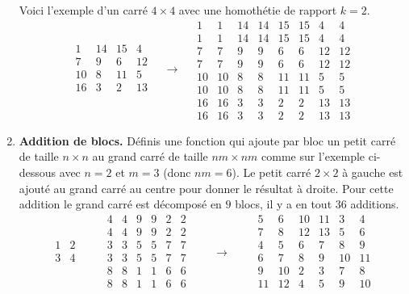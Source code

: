 \documentclass[11pt,class=report,crop=false]{standalone}
\begin{document}
\begin{activite}
\begin{enumerate}
Voici l'exemple d'un carré $4\times 4$ avec une homothétie de rapport $k=2$.
$$  
  \begin{array}{c|c|c|c}  
  1& 14& 15& 4\\\hline
  7& 9& 6& 12\\\hline
  10& 8& 11& 5\\\hline
  16& 3& 2& 13\\    
  \end{array} 
\quad  \longrightarrow \quad 
  \begin{array}{cc|cc|cc|cc}
 1& 1&14&14&15&15& 4& 4\\
  1& 1&14&14&15&15& 4& 4\\\hline
  7& 7& 9& 9& 6& 6&12&12\\
  7& 7& 9& 9& 6& 6&12&12\\\hline
 10&10& 8& 8&11&11& 5& 5\\
 10&10& 8& 8&11&11& 5& 5\\\hline
 16&16& 3& 3& 2& 2&13&13\\
 16&16& 3& 3& 2& 2&13&13
 \end{array}
  $$
  
\item \textbf{Addition de blocs.} Définis une fonction  qui ajoute par bloc un petit carré de taille $n \times n$ au grand carré de taille $nm \times nm$ comme sur l'exemple ci-dessous avec $n=2$ et $m=3$ (donc $nm=6$). Le petit carré $2 \times 2$ à gauche est ajouté au grand carré au centre pour donner le résultat à droite. Pour cette addition le grand carré est décomposé en $9$ blocs, il y a en tout $36$ additions.
$$
  \begin{array}{cc} 
  1& 2  \\
  3& 4  \\
  \end{array}
  \qquad
  \begin{array}{cc|cc|cc}  
  4& 4& 9& 9& 2& 2  \\
  4& 4& 9& 9& 2& 2  \\\hline
  3& 3& 5& 5& 7& 7  \\
  3& 3& 5& 5& 7& 7  \\\hline
  8& 8& 1& 1& 6& 6  \\
  8& 8& 1& 1& 6& 6  \\
  \end{array}
  \qquad  \longrightarrow \qquad
  \begin{array}{cc|cc|cc}
  5& 6&10&11& 3& 4  \\
  7& 8&12&13& 5& 6  \\\hline
  4& 5& 6& 7& 8& 9  \\
  6& 7& 8& 9&10&11  \\\hline
  9&10& 2& 3& 7& 8  \\
 11&12& 4& 5& 9&10  \\
  \end{array}
$$


\end{enumerate}
\end{activite}
\end{document}
